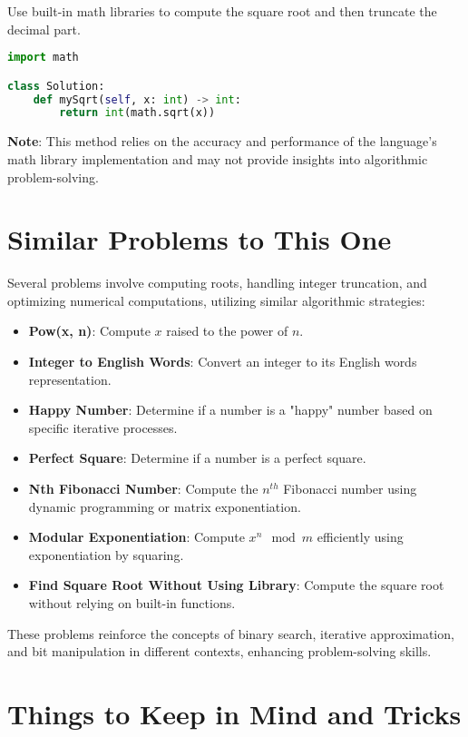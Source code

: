 Use built-in math libraries to compute the square root and then truncate the decimal part.

\begin{lstlisting}[language=Python]
import math

class Solution:
    def mySqrt(self, x: int) -> int:
        return int(math.sqrt(x))
\end{lstlisting}

\textbf{Note}: This method relies on the accuracy and performance of the language's math library implementation and may not provide insights into algorithmic problem-solving.

\section*{Similar Problems to This One}

Several problems involve computing roots, handling integer truncation, and optimizing numerical computations, utilizing similar algorithmic strategies:

\begin{itemize}
    \item \textbf{Pow(x, n)}: Compute \(x\) raised to the power of \(n\).
    \item \textbf{Integer to English Words}: Convert an integer to its English words representation.
    \item \textbf{Happy Number}: Determine if a number is a "happy" number based on specific iterative processes.
    \item \textbf{Perfect Square}: Determine if a number is a perfect square.
    \item \textbf{Nth Fibonacci Number}: Compute the \(n^{th}\) Fibonacci number using dynamic programming or matrix exponentiation.
    \item \textbf{Modular Exponentiation}: Compute \(x^n \mod m\) efficiently using exponentiation by squaring.
    \item \textbf{Find Square Root Without Using Library}: Compute the square root without relying on built-in functions.
\end{itemize}

These problems reinforce the concepts of binary search, iterative approximation, and bit manipulation in different contexts, enhancing problem-solving skills.

\section*{Things to Keep in Mind and Tricks}

